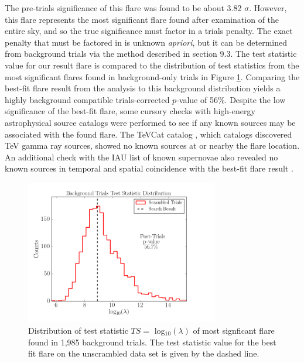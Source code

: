 \documentclass{gatech-thesis}
\begin{document}
The pre-trials significance of this flare was found to be about 3.82 $\sigma$. However, this flare represents the most significant flare found after examination of the entire sky, and so the true significance must factor in a trials penalty. The exact penalty that must be factored in is unknown \textit{apriori}, but it can be determined from background trials via the method described in section 9.3. The test statistic value for our result flare is compared to the distribution of test statistics from the most significant flares found in background-only trials in Figure \ref{fig:PostTrialsComparison}. Comparing the best-fit flare result from the analysis to this background distribution yields a highly background compatible trials-corrected $p$-value of 56$\%$. Despite the low significance of the best-fit flare, some cursory checks with high-energy astrophysical source catalogs were performed to see if any known sources may be associated with the found flare. The TeVCat catalog \cite{TeVCat}, which catalogs discovered TeV gamma ray sources, showed no known sources at or nearby the flare location. An additional check with the IAU list of known supernovae also revealed no known sources in temporal and spatial coincidence with the best-fit flare result \cite{SNeCatIAU}.

\begin{figure}[ht]
  \begin{center}
    \includegraphics[width=0.75\textwidth,keepaspectratio]{TestStatisticDistribution_WithResult.png}
  \end{center}
  \caption{Distribution of test statistic $TS =$ log$_{10}(\lambda)$ of most signficant flare found in 1,985 background trials. The test statistic value for the best fit flare on the unscrambled data set is given by the dashed line.}
  \label{fig:PostTrialsComparison}
\end{figure}
\end{document}

